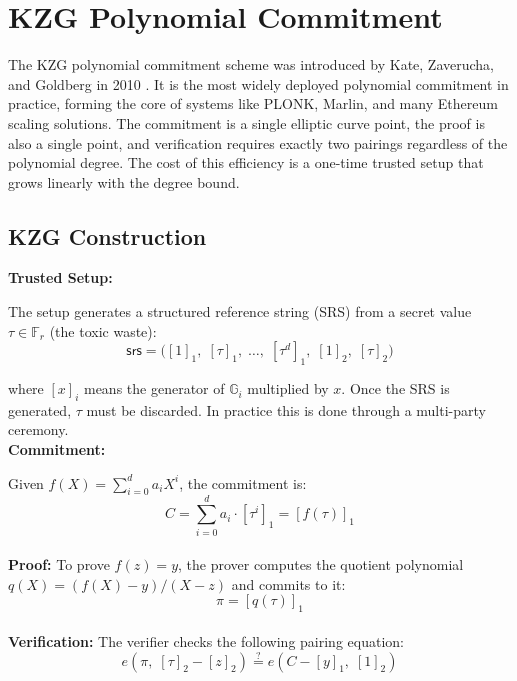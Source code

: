 
\chapter{KZG Polynomial Commitment}
\label{chap:kzg}

The KZG polynomial commitment scheme was introduced by Kate,
Zaverucha, and Goldberg in 2010 \cite{kate2010}. It is the most
widely deployed polynomial commitment in practice, forming the core
of systems like PLONK, Marlin, and many Ethereum scaling solutions.
The commitment is a single elliptic curve point, the proof is also
a single point, and verification requires exactly two pairings
regardless of the polynomial degree. The cost of this efficiency is
a one-time trusted setup that grows linearly with the degree bound.

\section{KZG Construction}

\textbf{Trusted Setup:}

The setup generates a structured reference string (SRS) from a
secret value $\tau \in \mathbb{F}_r$ (the toxic waste):
\begin{equation}
    \mathsf{srs} = \bigl(
        [1]_1,\; [\tau]_1,\; \ldots,\; [\tau^d]_1,\;
        [1]_2,\; [\tau]_2
    \bigr)
\end{equation}

where $[x]_i$ means the generator of $\mathbb{G}_i$ multiplied by
$x$. Once the SRS is generated, $\tau$ must be discarded. In
practice this is done through a multi-party ceremony.
\\
\textbf{Commitment:}

Given $f(X) = \sum_{i=0}^{d} a_i X^i$, the commitment is:
\begin{equation}
    C = \sum_{i=0}^{d} a_i \cdot [\tau^i]_1 = [f(\tau)]_1
\end{equation}
\\
\textbf{Proof:}
To prove $f(z) = y$, the prover computes the quotient polynomial
$q(X) = (f(X) - y) / (X - z)$ and commits to it:
\begin{equation}
    \pi = [q(\tau)]_1
\end{equation}
\\
\textbf{Verification:}
The verifier checks the following pairing equation:
\begin{equation}
    e\!\left(\pi,\; [\tau]_2 - [z]_2\right)
    \stackrel{?}{=}
    e\!\left(C - [y]_1,\; [1]_2\right)
\end{equation}

